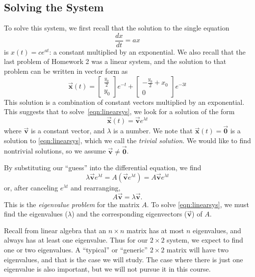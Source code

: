 \documentclass{book}
\newcommand{\BV}{\vec{\textbf{v}}}
\newcommand{\BX}{\vec{\textbf{x}}}
\newcommand{\BZ}{\vec{\textbf{0}}}  %
\begin{document}
\subsection*{Solving the System}
To solve this system, we first recall that the solution to the
single equation
\begin{equation}
  \frac{dx}{dt} = a x
\end{equation}
is $x(t) = c e^{at}$: a constant multiplied by
an exponential.  We also recall that the last problem of Homework 2
was a linear system, and the solution to that problem can be
written in vector form as
\begin{equation}
 \BX(t) = \begin{bmatrix} \frac{y_0}{2} \\ y_0 \end{bmatrix} e^{-t}
            +\begin{bmatrix} -\frac{y_0}{2}+x_0 \\ 0 \end{bmatrix} e^{-3t}
\end{equation}
This solution is a combination of constant vectors
multiplied by an exponential.
This suggests that to solve~\eqref{eqn:linearsys},
we look for a solution of the form
\begin{equation}
  \BX(t) = \BV e^{\lambda t}
\end{equation}
where $\BV$ is a constant vector, and $\lambda$ is a number.
We note that $\BX(t) = \BZ$ is a solution to \eqref{eqn:linearsys},
which we call the \emph{trivial solution}.
We would like to
find nontrivial solutions, so we assume $\BV\ne \BZ$.

By substituting our ``guess'' into the differential equation, we
find
\begin{equation}
  \lambda \BV e^{\lambda t} = A\left(\BV e^{\lambda t}\right)
       = A\BV e^{\lambda t}
\end{equation}
or, after canceling $e^{\lambda t}$ and rearranging,
\begin{equation}
   A\BV = \lambda \BV.
\label{eqn:eigenvalueprob}
\end{equation}
This is the \emph{eigenvalue problem}
for the matrix $A$.
To solve \eqref{eqn:linearsys}, we must find
the eigenvalues ($\lambda$) and
the corresponding eigenvectors ($\BV$) of $A$.

Recall from linear algebra that an $n\times n$ matrix
has at most $n$ eigenvalues, and always has at least
one eigenvalue.  Thus for our $2\times 2$
system, we expect to find one or two eigenvalues.
A ``typical'' or ``generic'' $2\times 2$ matrix
will have two eigenvalues, and that is the case
we will study.  The case where there is just one
eigenvalue is also important, but we will not pursue
it in this course.
\end{document}
